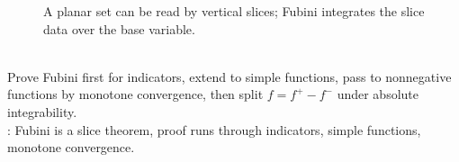 \begin{figure}[H]
  \centering
  
  \caption{A planar set can be read by vertical slices; Fubini integrates the slice data over the base variable.}
  \label{fig:cavalieri-slicing-planar-set}
\end{figure}

\begin{perspective} \label{per:fubini-proof-ladder} \\
Prove Fubini first for indicators, extend to simple functions, pass to nonnegative functions by monotone convergence, then split $f=f^+-f^-$ under absolute integrability.\\
: Fubini is a slice theorem, proof runs through indicators, simple functions, monotone convergence.
\end{perspective}

